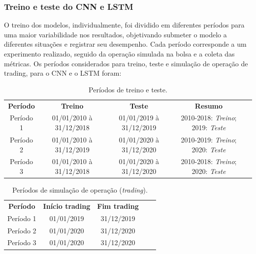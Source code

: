 \subsubsection{Treino e teste do CNN e LSTM}

\par
O treino dos modelos, individualmente, foi dividido em diferentes períodos para uma maior variabilidade nos resultados, objetivando submeter o modelo a diferentes situações e registrar seu desempenho. Cada período corresponde a um experimento realizado, seguido da operação simulada na bolsa e a coleta das métricas. Os períodos considerados para treino, teste e simulação de operação de trading, para o CNN e o LSTM foram:


\begin{table}[htp]
\footnotesize
\centering
\caption{Períodos de treino e teste.}
\begin{tabular}{lllll}
\cline{1-4}
\multicolumn{1}{c}{\textbf{Período}} & \multicolumn{1}{c}{\textbf{Treino}} & \multicolumn{1}{c}{\textbf{Teste}} & \multicolumn{1}{c}{\textbf{Resumo}} &  \\ \cline{1-4}
\multicolumn{1}{c}{Período   1} & \multicolumn{1}{c}{01/01/2010    à  31/12/2018} & \multicolumn{1}{c}{01/01/2019    à  31/12/2019} & \multicolumn{1}{c}{2010-2018:   \textit{Treino};  2019: \textit{Teste}} &  \\
\multicolumn{1}{c}{Período   2} & \multicolumn{1}{c}{01/01/2010    à  31/12/2019} & \multicolumn{1}{c}{01/01/2020    à  31/12/2020} & \multicolumn{1}{c}{2010-2019:   \textit{Treino};  2020: \textit{Teste}} &  \\
\multicolumn{1}{c}{Período   3} & \multicolumn{1}{c}{01/01/2010    à  31/12/2018} & \multicolumn{1}{c}{01/01/2020    à  31/12/2020} & \multicolumn{1}{c}{2010-2018: \textit{Treino};  2020:   \textit{Teste}} &  \\ \cline{1-4}
\end{tabular}
\end{table}


\begin{table}[htp]
\footnotesize
\centering
\caption{Períodos de simulação de operação (\textit{trading}).}
\begin{tabular}{lllll}
\cline{1-3}
\multicolumn{1}{c}{\textbf{Período}} & \multicolumn{1}{c}{\textbf{Início   trading}} & \multicolumn{1}{c}{\textbf{Fim   trading}} &  &  \\ \cline{1-3}
\multicolumn{1}{c}{Período   1} & \multicolumn{1}{c}{01/01/2019} & \multicolumn{1}{c}{31/12/2019} &  &  \\
\multicolumn{1}{c}{Período   2} & \multicolumn{1}{c}{01/01/2020} & \multicolumn{1}{c}{31/12/2020} &  &  \\
\multicolumn{1}{c}{Período   3} & \multicolumn{1}{c}{01/01/2020} & \multicolumn{1}{c}{31/12/2020} &  &  \\ \cline{1-3}
\end{tabular}
\end{table}


